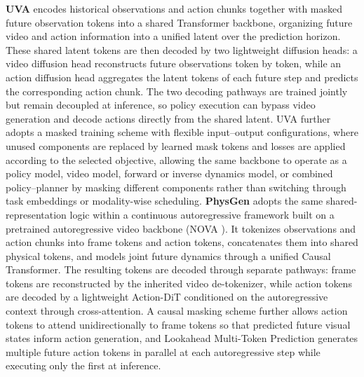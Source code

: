 \textbf{UVA} \cite{UVA} encodes historical observations and action chunks together with masked future observation tokens into a shared Transformer backbone, organizing future video and action information into a unified latent over the prediction horizon. These shared latent tokens are then decoded by two lightweight diffusion heads: a video diffusion head reconstructs future observations token by token, while an action diffusion head aggregates the latent tokens of each future step and predicts the corresponding action chunk. The two decoding pathways are trained jointly but remain decoupled at inference, so policy execution can bypass video generation and decode actions directly from the shared latent. UVA further adopts a masked training scheme with flexible input–output configurations, where unused components are replaced by learned mask tokens and losses are applied according to the selected objective, allowing the same backbone to operate as a policy model, video model, forward or inverse dynamics model, or combined policy–planner by masking different components rather than switching through task embeddings or modality-wise scheduling. \textbf{PhysGen} \cite{PhysGen} adopts the same shared-representation logic within a continuous autoregressive framework built on a pretrained autoregressive video backbone (NOVA \cite{NOVA}). It tokenizes observations and action chunks into frame tokens and action tokens, concatenates them into shared physical tokens, and models joint future dynamics through a unified Causal Transformer. The resulting tokens are decoded through separate pathways: frame tokens are reconstructed by the inherited video de-tokenizer, while action tokens are decoded by a lightweight Action-DiT conditioned on the autoregressive context through cross-attention. A causal masking scheme further allows action tokens to attend unidirectionally to frame tokens so that predicted future visual states inform action generation, and Lookahead Multi-Token Prediction generates multiple future action tokens in parallel at each autoregressive step while executing only the first at inference.

